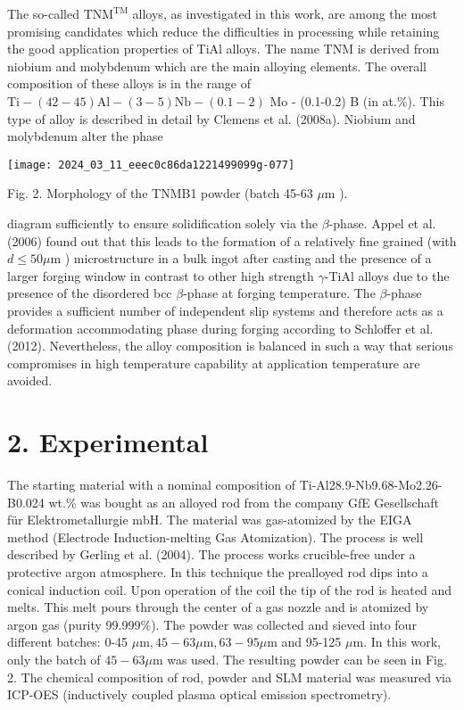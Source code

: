 \documentclass[10pt]{article}
\begin{document}
The so-called $\mathrm{TNM}^{\mathrm{TM}}$ alloys, as investigated in this work, are among the most promising candidates which reduce the difficulties in processing while retaining the good application properties of TiAl alloys. The name TNM is derived from niobium and molybdenum which are the main alloying elements. The overall composition of these alloys is in the range of $\mathrm{Ti}-(42-45) \mathrm{Al}-(3-5) \mathrm{Nb}-(0.1-2)$ Mo - (0.1-0.2) B (in at.\%). This type of alloy is described in detail by Clemens et al. (2008a). Niobium and molybdenum alter the phase

\begin{center}
\texttt{[image: 2024\_03\_11\_eeec0c86da1221499099g-077]}
\end{center}

Fig. 2. Morphology of the TNMB1 powder (batch 45-63 $\mu \mathrm{m}$ ).

diagram sufficiently to ensure solidification solely via the $\beta$-phase. Appel et al. (2006) found out that this leads to the formation of a relatively fine grained (with $d \leq 50 \mu \mathrm{m}$ ) microstructure in a bulk ingot after casting and the presence of a larger forging window in contrast to other high strength $\gamma$-TiAl alloys due to the presence of the disordered bcc $\beta$-phase at forging temperature. The $\beta$-phase provides a sufficient number of independent slip systems and therefore acts as a deformation accommodating phase during forging according to Schloffer et al. (2012). Nevertheless, the alloy composition is balanced in such a way that serious compromises in high temperature capability at application temperature are avoided.

\section*{2. Experimental}
The starting material with a nominal composition of Ti-Al28.9-Nb9.68-Mo2.26-B0.024 wt.\% was bought as an alloyed rod from the company GfE Gesellschaft für Elektrometallurgie $\mathrm{mbH}$. The material was gas-atomized by the EIGA method (Electrode Induction-melting Gas Atomization). The process is well described by Gerling et al. (2004). The process works crucible-free under a protective argon atmosphere. In this technique the prealloyed rod dips into a conical induction coil. Upon operation of the coil the tip of the rod is heated and melts. This melt pours through the center of a gas nozzle and is atomized by argon gas (purity 99.999\%). The powder was collected and sieved into four different batches: 0-45 $\mu \mathrm{m}, 45-63 \mu \mathrm{m}, 63-95 \mu \mathrm{m}$ and 95-125 $\mu \mathrm{m}$. In this work, only the batch of $45-63 \mu \mathrm{m}$ was used. The resulting powder can be seen in Fig. 2. The chemical composition of rod, powder and SLM material was measured via ICP-OES (inductively coupled plasma optical emission spectrometry).
\end{document}
